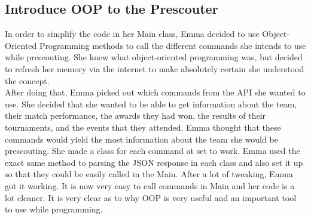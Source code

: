 \documentclass{article}
\begin{document}
\subsection{Introduce OOP to the Prescouter}
In order to simplify the code in her Main class, Emma decided to use Object-Oriented Programming methods to call the different commands she intends to use while prescouting. She knew what object-oriented programming was, but decided to refresh her memory via the internet to make absolutely certain she understood the concept. \\

After doing that, Emma picked out which commands from the API she wanted to use. She decided that she wanted to be able to get information about the team, their match performance, the awards they had won, the results of their tournaments, and the events that they attended. Emma thought that these commands would yield the most information about the team she would be prescouting. She made a class for each command at set to work. Emma used the exact same method to parsing the JSON response in each class and also set it up so that they could be easily called in the Main. After a lot of tweaking, Emma got it working. It is now very easy to call commands in Main and her code is a lot cleaner. It is very clear as to why OOP is very useful and an important tool to use while programming. 
\end{document}
